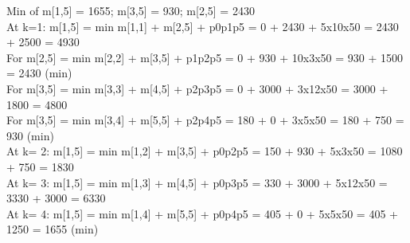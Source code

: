 \documentclass[addpoints,11pt]{exam}
\begin{document}
\begin{questions}
\begin{solutionorbox}
Min of m[1,5] = 1655; m[3,5] = 930; m[2,5] = 2430\\
At k=1: m[1,5] = {min {m[1,1] + m[2,5] + p0p1p5}}  = 0 + 2430 + 5x10x50 = 2430 + 2500 = 4930\\
\hspace*{5mm}For m[2,5] = {min {m[2,2] + m[3,5] + p1p2p5}} =   0 + 930 + 10x3x50 = 930 + 1500 = 2430 (min)\\
\hspace*{5mm}For m[3,5] = {min {m[3,3] + m[4,5] + p2p3p5}} = 0 + 3000 + 3x12x50 = 3000 + 1800 = 4800\\
\hspace*{5mm}For m[3,5] = {min {m[3,4] + m[5,5] + p2p4p5}} = 180 + 0 + 3x5x50 = 180 + 750 = 930 (min)\\
At k= 2: m[1,5] = {min {m[1,2] + m[3,5] + p0p2p5}} = 150 + 930 + 5x3x50 = 1080 + 750 = 1830\\
At k= 3: m[1,5] = {min {m[1,3] + m[4,5] + p0p3p5}} = 330 + 3000 + 5x12x50 = 3330 + 3000 = 6330\\
At k= 4: m[1,5] = {min {m[1,4] + m[5,5] + p0p4p5}} = 405 + 0 + 5x5x50 = 405 + 1250 = 1655 (min)\\


\end{solutionorbox}
\end{questions}
\end{document}
